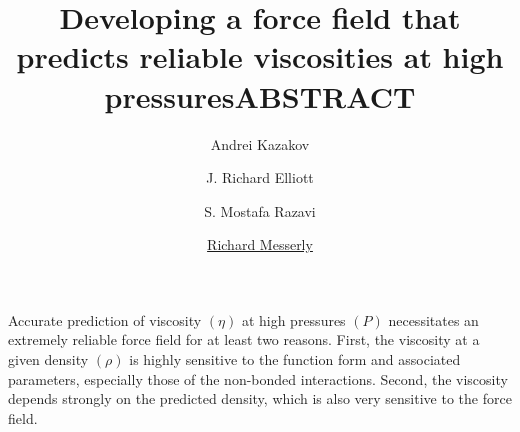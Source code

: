 \documentclass[11pt,a4paper]{article}
\begin{document}
	\thispagestyle{empty}
	\title{\Large \textbf{Developing a force field that predicts reliable viscosities at high pressures}}
	\author[1]{\large {Andrei Kazakov}}
	\author[2]{\large {J. Richard Elliott}}
	\author[2]{\large {S. Mostafa Razavi}}
	\author[1]{\large {\underline{Richard Messerly}}}%

	
	
	\date{} %
	\maketitle\thispagestyle{empty} %
	\begin{center}
		\title{\textbf{ABSTRACT}}\centering{}
	\end{center}
	\justify
	
	
	
	
	
	Accurate prediction of viscosity $(\eta)$ at high pressures $(P)$ necessitates an extremely reliable force field for at least two reasons. First, the viscosity at a given density $(\rho)$ is highly sensitive to the function form and associated parameters, especially those of the non-bonded interactions. Second, the viscosity depends strongly on the predicted density, which is also very sensitive to the force field. 
	
\end{document}
